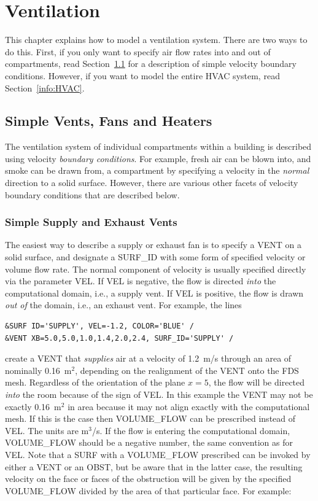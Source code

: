 \documentclass[11pt]{book}
\begin{document}
\chapter{Ventilation}

This chapter explains how to model a ventilation system. There are two ways to do this. First, if you only want to specify air flow rates into and out of
compartments, read Section~\ref{info:Velocity_BC} for a description of simple velocity boundary conditions. However, if you want to
model the entire HVAC system, read Section~\ref{info:HVAC}.


\section{Simple Vents, Fans and Heaters}
\label{info:Velocity_BC}

The ventilation system of individual compartments within a building is described using
velocity {\em boundary conditions}. For example, fresh air can be blown into, and smoke can
be drawn from, a compartment by specifying a velocity in the {\em normal} direction to a solid
surface. However, there are various other facets of velocity boundary conditions that are described below.

\subsection{Simple Supply and Exhaust Vents}

The easiest way to describe a supply or exhaust fan is to specify a {\ct VENT} on a solid surface, and designate
a {\ct SURF\_ID} with some form of specified velocity or volume flow rate.
The normal component of velocity is usually specified directly via the parameter
{\ct VEL}. If {\ct VEL} is negative, the flow is directed {\em into} the
computational domain, i.e., a supply vent. If {\ct VEL} is positive, the flow is drawn {\em out of} the
domain, i.e., an exhaust vent. For example, the lines

\begin{lstlisting}
&SURF ID='SUPPLY', VEL=-1.2, COLOR='BLUE' /
&VENT XB=5.0,5.0,1.0,1.4,2.0,2.4, SURF_ID='SUPPLY' /
\end{lstlisting}

\noindent
create a {\ct VENT} that {\em supplies} air at a velocity of 1.2~m/s through an area of nominally 0.16~m$^2$, depending on the
realignment of the {\ct VENT} onto the FDS mesh. Regardless of the
orientation of the plane $x=5$, the flow will be directed {\em into} the room because of the sign of {\ct VEL}.
In this example the {\ct VENT} may not be exactly
0.16~m$^2$ in area because it may not align exactly with the computational mesh. If this is the case then
{\ct VOLUME\_FLOW} can be prescribed instead of {\ct VEL}. The units
are m$^3$/s. If the flow is entering the computational domain, {\ct VOLUME\_FLOW}
should be a negative number, the same convention as for {\ct VEL}. Note that a {\ct SURF}
with a {\ct VOLUME\_FLOW} prescribed can be invoked by either a
{\ct VENT} or an {\ct OBST}, but be aware that in the latter case, the resulting
velocity on the face or faces of the obstruction will be given by the specified
{\ct VOLUME\_FLOW} divided by the area of that particular face. For example:
\end{document}
